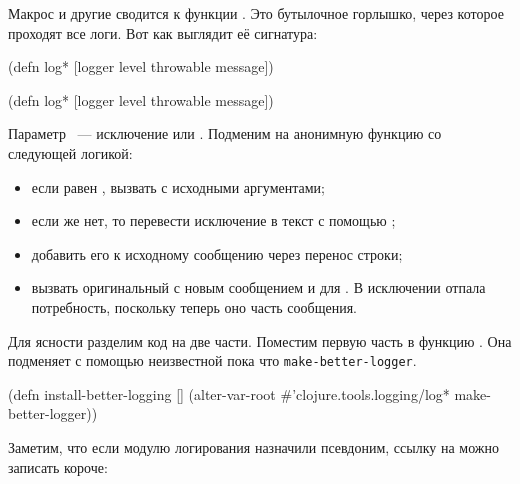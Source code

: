 
Макрос  и другие сводится к функции . Это
бутылочное горлышко, через которое проходят все логи. Вот как выглядит её
сигнатура:

\ifnarrow

\begin{clojure}
(defn log*
  [logger level throwable message])
\end{clojure}

\else

\begin{clojure}
(defn log* [logger level throwable message])
\end{clojure}

\fi

Параметр ~--- исключение или . Подменим  на
анонимную функцию со следующей логикой:

\begin{itemize}

\item
  если  равен , вызвать  с исходными
  аргументами;

\item
  если же нет, то перевести исключение в текст с помощью ;

\item
  добавить его к исходному сообщению через перенос строки;

\item
  вызвать оригинальный  с новым сообщением и  для
  . В исключении отпала потребность, поскольку теперь оно
  часть сообщения.

\end{itemize}

Для ясности разделим код на две части. Поместим первую часть в функцию
. Она подменяет  с помощью неизвестной
пока что \texttt{make-better-logger}.

\begin{clojure}
(defn install-better-logging []
  (alter-var-root
   #'clojure.tools.logging/log*
   make-better-logger))
\end{clojure}

Заметим, что если модулю логирования назначили псевдоним, ссылку на 
можно записать короче:


\ifnarrow

